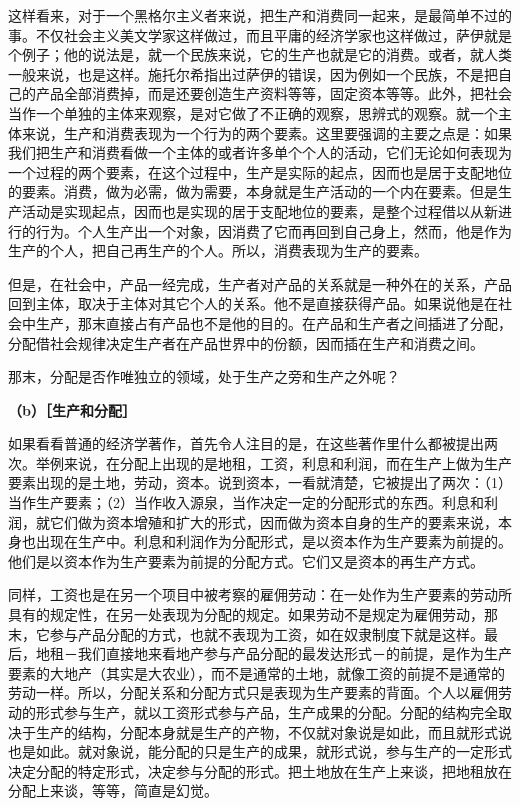 \documentclass[a4paper,twoside,12pt]{ctexart}
\begin{document}
这样看来，对于一个黑格尔主义者来说，把生产和消费同一起来，是最简单不过的事。不仅社会主义美文学家这样做过，而且平庸的经济学家也这样做过，萨伊就是个例子；他的说法是，就一个民族来说，它的生产也就是它的消费。或者，就人类一般来说，也是这样。施托尔希指出过萨伊的错误，因为例如一个民族，不是把自己的产品全部消费掉，而是还要创造生产资料等等，固定资本等等。此外，把社会当作一个单独的主体来观察，是对它做了不正确的观察，思辨式的观察。就一个主体来说，生产和消费表现为一个行为的两个要素。这里要强调的主要之点是：如果我们把生产和消费看做一个主体的或者许多单个个人的活动，它们无论如何表现为一个过程的两个要素，在这个过程中，生产是实际的起点，因而也是居于支配地位的要素。消费，做为必需，做为需要，本身就是生产活动的一个内在要素。但是生产活动是实现起点，因而也是实现的居于支配地位的要素，是整个过程借以从新进行的行为。个人生产出一个对象，因消费了它而再回到自己身上，然而，他是作为生产的个人，把自己再生产的个人。所以，消费表现为生产的要素。

但是，在社会中，产品一经完成，生产者对产品的关系就是一种外在的关系，产品回到主体，取决于主体对其它个人的关系。他不是直接获得产品。如果说他是在社会中生产，那末直接占有产品也不是他的目的。在产品和生产者之间插进了分配，分配借社会规律决定生产者在产品世界中的份额，因而插在生产和消费之间。

那末，分配是否作唯独立的领域，处于生产之旁和生产之外呢？

\textbf{（b）［生产和分配］}

如果看看普通的经济学著作，首先令人注目的是，在这些著作里什么都被提出两次。举例来说，在分配上出现的是地租，工资，利息和利润，而在生产上做为生产要素出现的是土地，劳动，资本。说到资本，一看就清楚，它被提出了两次：（1）当作生产要素；（2）当作收入源泉，当作决定一定的分配形式的东西。利息和利润，就它们做为资本增殖和扩大的形式，因而做为资本自身的生产的要素来说，本身也出现在生产中。利息和利润作为分配形式，是以资本作为生产要素为前提的。他们是以资本作为生产要素为前提的分配方式。它们又是资本的再生产方式。

同样，工资也是在另一个项目中被考察的雇佣劳动：在一处作为生产要素的劳动所具有的规定性，在另一处表现为分配的规定。如果劳动不是规定为雇佣劳动，那末，它参与产品分配的方式，也就不表现为工资，如在奴隶制度下就是这样。最后，地租－我们直接地来看地产参与产品分配的最发达形式－的前提，是作为生产要素的大地产（其实是大农业），而不是通常的土地，就像工资的前提不是通常的劳动一样。所以，分配关系和分配方式只是表现为生产要素的背面。个人以雇佣劳动的形式参与生产，就以工资形式参与产品，生产成果的分配。分配的结构完全取决于生产的结构，分配本身就是生产的产物，不仅就对象说是如此，而且就形式说也是如此。就对象说，能分配的只是生产的成果，就形式说，参与生产的一定形式决定分配的特定形式，决定参与分配的形式。把土地放在生产上来谈，把地租放在分配上来谈，等等，简直是幻觉。
\end{document}
